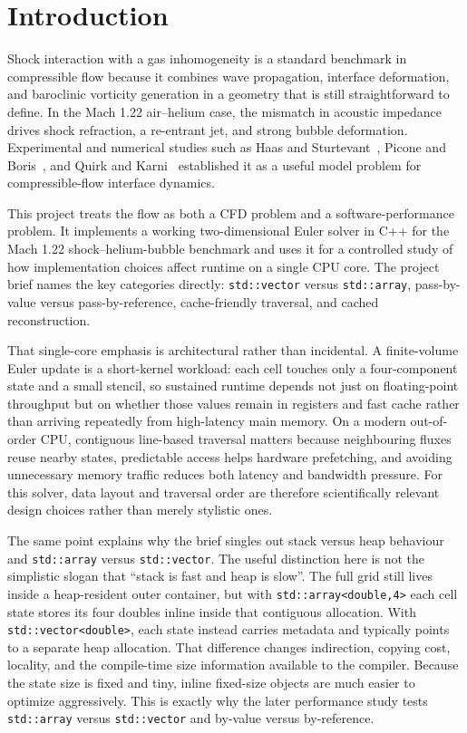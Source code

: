 \documentclass[final,3p,times,twocolumn]{elsarticle}
\begin{document}
\section{Introduction}

Shock interaction with a gas inhomogeneity is a standard benchmark in compressible flow because it combines wave propagation, interface deformation, and baroclinic vorticity generation in a geometry that is still straightforward to define. In the Mach 1.22 air--helium case, the mismatch in acoustic impedance drives shock refraction, a re-entrant jet, and strong bubble deformation. Experimental and numerical studies such as Haas and Sturtevant~\cite{haas1987}, Picone and Boris~\cite{picone1988}, and Quirk and Karni~\cite{quirk1996} established it as a useful model problem for compressible-flow interface dynamics.

This project treats the flow as both a CFD problem and a software-performance problem. It implements a working two-dimensional Euler solver in C++ for the Mach 1.22 shock--helium-bubble benchmark and uses it for a controlled study of how implementation choices affect runtime on a single CPU core. The project brief names the key categories directly: \texttt{std::vector} versus \texttt{std::array}, pass-by-value versus pass-by-reference, cache-friendly traversal, and cached reconstruction.

That single-core emphasis is architectural rather than incidental. A finite-volume Euler update is a short-kernel workload: each cell touches only a four-component state and a small stencil, so sustained runtime depends not just on floating-point throughput but on whether those values remain in registers and fast cache rather than arriving repeatedly from high-latency main memory. On a modern out-of-order CPU, contiguous line-based traversal matters because neighbouring fluxes reuse nearby states, predictable access helps hardware prefetching, and avoiding unnecessary memory traffic reduces both latency and bandwidth pressure. For this solver, data layout and traversal order are therefore scientifically relevant design choices rather than merely stylistic ones.

The same point explains why the brief singles out stack versus heap behaviour and \texttt{std::array} versus \texttt{std::vector}. The useful distinction here is not the simplistic slogan that ``stack is fast and heap is slow''. The full grid still lives inside a heap-resident outer container, but with \texttt{std::array<double,4>} each cell state stores its four doubles inline inside that contiguous allocation. With \texttt{std::vector<double>}, each state instead carries metadata and typically points to a separate heap allocation. That difference changes indirection, copying cost, locality, and the compile-time size information available to the compiler. Because the state size is fixed and tiny, inline fixed-size objects are much easier to optimize aggressively. This is exactly why the later performance study tests \texttt{std::array} versus \texttt{std::vector} and by-value versus by-reference.
\end{document}
